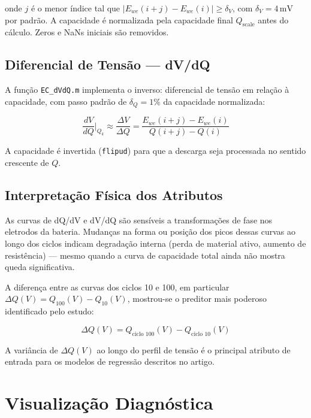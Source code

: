 \documentclass[12pt,a4paper]{article}
\begin{document}
onde $j$ \'{e} o menor \'{i}ndice tal que $|E_{we}(i+j) - E_{we}(i)| \geq \delta_V$,
com $\delta_V = 4\,\text{mV}$ por padr\~ao. A capacidade \'{e} normalizada pela
capacidade final $Q_\text{scale}$ antes do c\'{a}lculo. Zeros e NaNs iniciais s\~ao
removidos.

\subsection{Diferencial de Tens\~ao --- dV/dQ}

A fun\c{c}\~ao \texttt{EC\_dVdQ.m} implementa o inverso: diferencial de tens\~ao em
rela\c{c}\~ao \`{a} capacidade, com passo padr\~ao de $\delta_Q = 1\%$ da capacidade
normalizada:

\begin{equation}
\frac{dV}{dQ}\bigg|_{Q_k} \approx \frac{\Delta V}{\Delta Q} =
\frac{E_{we}(i+j) - E_{we}(i)}{Q(i+j) - Q(i)}
\end{equation}

A capacidade \'{e} invertida (\texttt{flipud}) para que a descarga seja processada
no sentido crescente de $Q$.

\subsection{Interpreta\c{c}\~ao F\'{i}sica dos Atributos}

As curvas de dQ/dV e dV/dQ s\~ao sens\'{i}veis a transforma\c{c}\~oes de fase nos eletrodos
da bateria. Mudan\c{c}as na forma ou posi\c{c}\~ao dos picos dessas curvas ao longo dos
ciclos indicam degrada\c{c}\~ao interna (perda de material ativo, aumento de resist\^{e}ncia)
--- mesmo quando a curva de capacidade total ainda n\~ao mostra queda significativa.

A diferen\c{c}a entre as curvas dos ciclos 10 e 100, em particular
$\Delta Q(V) = Q_{100}(V) - Q_{10}(V)$, mostrou-se o preditor mais poderoso
identificado pelo estudo:

\begin{equation}
\Delta Q(V) = Q_{\text{ciclo 100}}(V) - Q_{\text{ciclo 10}}(V)
\end{equation}

A vari\^{a}ncia de $\Delta Q(V)$ ao longo do perfil de tens\~ao \'{e} o principal
atributo de entrada para os modelos de regress\~ao descritos no artigo.

\section{Visualiza\c{c}\~ao Diagn\'{o}stica}
\end{document}
